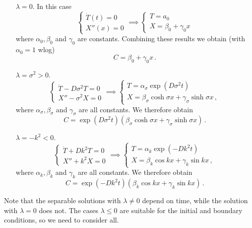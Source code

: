 \documentclass{article}
\theoremstyle{plain}\theoremheaderfont{\normalfont\itshape}\theorembodyfont{\rmfamily}\theoremseparator{.}\newtheorem*{rem}{Remark}\newtheorem*{ex}{Example}\newtheorem*{proof}{Proof}\newtheorem*{altp}{Alternative proof}
\theoremstyle{plain}\theoremheaderfont{\normalfont\bfseries}\theorembodyfont{\rmfamily}\theoremseparator{.}\newtheorem{thm}{Theorem}[section]\newtheorem{lem}[thm]{Lemma}\newtheorem{prop}[thm]{Proposition}\newtheorem*{cor}{Corollary}\newtheorem{defn}[thm]{Definition}\newtheorem{clm}[thm]{Claim}\newtheorem{clminproof}{Claim}
\theoremstyle{break}\theoremheaderfont{\normalfont\itshape}\theorembodyfont{\rmfamily}\theoremseparator{.\medskip}\newtheorem*{proofskip}{Proof}\newtheorem*{exs}{Examples}\newtheorem*{rems}{Remarks}
\theoremstyle{break}\theoremheaderfont{\normalfont\bfseries}\theorembodyfont{\rmfamily}\theoremseparator{.\medskip}\newtheorem{lemskip}[thm]{Lemma}\newtheorem{defnskip}[thm]{Definition}\newtheorem{propskip}[thm]{Proposition}\newtheorem{thmskip}[thm]{Theorem}
\numberwithin{equation}{section}
\begin{document}
	\begin{itemize}[leftmargin=32pt]
		\item[\(\lambda=0\).] In this case
		\[\begin{cases}
			\dot{T}(t)=0\\
			X''(x)=0
		\end{cases}\implies\begin{cases}
			T=a_0\\
			X=\beta_0+\gamma_0 x
		\end{cases}\]
		where \(\alpha_0,\beta_0\) and \(\gamma_0\) are constants. Combining these results we obtain (with \(\alpha_0=1\) wlog)
		\[C=\beta_0+\gamma_0 x\,.\]
	\end{itemize}
	\begin{itemize}[leftmargin=32pt,itemindent=24pt]
		\item[\(\lambda=\sigma^2>0\).]
		\[\begin{cases}
			\dot{T}-D\sigma^2T=0\\
			X''-\sigma^2X=0
		\end{cases}\implies\begin{cases}
			T=\alpha_\sigma\exp(D\sigma^2 t)\\
			X=\beta_\sigma\cosh\sigma x+\gamma_\sigma\sinh\sigma x\,,
	\end{cases}\]
		where \(\alpha_\sigma,\beta_\sigma\) and \(\gamma_\sigma\) are all constants. We therefore obtain
		\[C=\exp(D\sigma^2 t)(\beta_\sigma\cosh\sigma x+\gamma_\sigma\sinh\sigma x)\,.\]
	\end{itemize}
	\begin{itemize}[leftmargin=32pt,itemindent=31pt]
		\item[\(\lambda=-k^2<0\).]
		\[\begin{cases}
			\dot{T}+Dk^2T=0\\
			X''+k^2X=0
		\end{cases}\implies\begin{cases}
			T=\alpha_k\exp(-Dk^2 t)\\
			X=\beta_k\cos kx+\gamma_k\sin kx\,,
		\end{cases}\]
		where \(\alpha_k,\beta_k\) and \(\gamma_k\) are all constants. We therefore obtain
		\[C=\exp(-Dk^2 t)(\beta_k\cos kx+\gamma_k\sin kx)\,.\]
	\end{itemize}
	
	Note that the separable solutions with \(\lambda\ne 0\) depend on time, while the solution with \(\lambda=0\) does not. The cases \(\lambda\le 0\) are suitable for the initial and boundary conditions, so we need to consider all.
	
\end{document}
